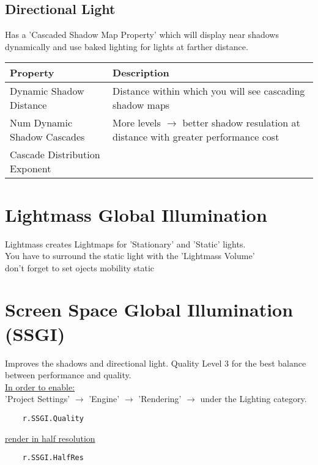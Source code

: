         \subsection{Directional Light}
            Has a 'Cascaded Shadow Map Property' which will display near shadows dynamically and use baked lighting for 
            lights at farther distance.
            \begin{table}[H]
                \begin{tabular}{|p{7cm}|p{12cm}|}
                    \hline
                        Property & Description \\
                    \hline
                        Dynamic Shadow Distance & Distance within which you will see cascading shadow maps \\
                        Num Dynamic Shadow Cascades & More levels $\rightarrow$ better shadow resulation at distance with greater performance cost \\
                        Cascade Distribution Exponent &  \\ %
                    \hline
                \end{tabular}
            \end{table}  

    \section{Lightmass Global Illumination}
        Lightmass creates Lightmaps for 'Stationary' and 'Static' lights.\\
        You have to surround the static light with the 'Lightmass Volume' \\
        don't forget to set ojects mobility static \\

    \section{Screen Space Global Illumination (SSGI)}
        Improves the shadows and directional light. Quality Level 3 for the best balance between performance and quality. \\
        \underline{In order to enable:} \\
        'Project Settings' $\rightarrow$ 'Engine' $\rightarrow$ 'Rendering' $\rightarrow$ under the Lighting category.  \\
        \begin{lstlisting}
    r.SSGI.Quality
        \end{lstlisting}
        \underline{render in half resolution}
        \begin{lstlisting}
    r.SSGI.HalfRes
        \end{lstlisting}

